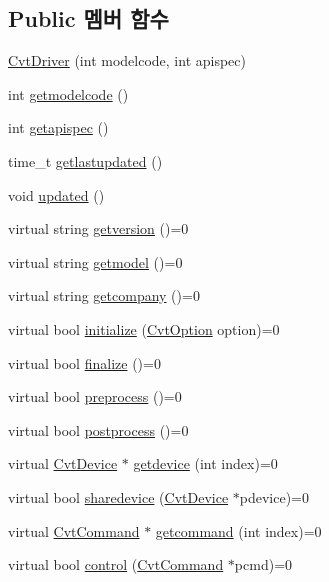 \subsection*{Public 멤버 함수}
\begin{DoxyCompactItemize}
\item 
\hyperlink{classstdcvt_1_1CvtDriver_a82925971b6e8ef2ce7f0b5d113120855}{Cvt\+Driver} (int modelcode, int apispec)
\item 
int \hyperlink{classstdcvt_1_1CvtDriver_a86ffa63425176824f6b0493be4e41cda}{getmodelcode} ()
\item 
int \hyperlink{classstdcvt_1_1CvtDriver_ad6e0edc0bc47015d446215e98b7bfc2f}{getapispec} ()
\item 
time\+\_\+t \hyperlink{classstdcvt_1_1CvtDriver_a442304919575a1c0adf4e89cd85a3bfb}{getlastupdated} ()
\item 
void \hyperlink{classstdcvt_1_1CvtDriver_abbaba1b9dd80aae9648dac8a44f31589}{updated} ()
\item 
virtual string \hyperlink{classstdcvt_1_1CvtDriver_a4b21fdbbee5e251ce8b65932108db51e}{getversion} ()=0
\item 
virtual string \hyperlink{classstdcvt_1_1CvtDriver_a276c9154120dc41563a6604dc9d8e15b}{getmodel} ()=0
\item 
virtual string \hyperlink{classstdcvt_1_1CvtDriver_a7566cb63ae741c1df91972f185dbc88c}{getcompany} ()=0
\item 
virtual bool \hyperlink{classstdcvt_1_1CvtDriver_a71322934c5b5ad0d5b167219cd23a0bb}{initialize} (\hyperlink{classstdcvt_1_1CvtOption}{Cvt\+Option} option)=0
\item 
virtual bool \hyperlink{classstdcvt_1_1CvtDriver_a22b39da5aafabec2ee9677ed138256e9}{finalize} ()=0
\item 
virtual bool \hyperlink{classstdcvt_1_1CvtDriver_ac15259a26d652d46c198307886d52257}{preprocess} ()=0
\item 
virtual bool \hyperlink{classstdcvt_1_1CvtDriver_a4bcae9e7c58d989a645a74d21e2fc5ea}{postprocess} ()=0
\item 
virtual \hyperlink{classstdcvt_1_1CvtDevice}{Cvt\+Device} $\ast$ \hyperlink{classstdcvt_1_1CvtDriver_adc2ce5ff6fe2426fd84ce3ae69731704}{getdevice} (int index)=0
\item 
virtual bool \hyperlink{classstdcvt_1_1CvtDriver_aeedcd62d3b6ed95f0584db5a7259f642}{sharedevice} (\hyperlink{classstdcvt_1_1CvtDevice}{Cvt\+Device} $\ast$pdevice)=0
\item 
virtual \hyperlink{classstdcvt_1_1CvtCommand}{Cvt\+Command} $\ast$ \hyperlink{classstdcvt_1_1CvtDriver_ad0378635152f2e35c0686c4fe92996e6}{getcommand} (int index)=0
\item 
virtual bool \hyperlink{classstdcvt_1_1CvtDriver_ac289321a67d660f5514c4ddfaa238ade}{control} (\hyperlink{classstdcvt_1_1CvtCommand}{Cvt\+Command} $\ast$pcmd)=0
\end{DoxyCompactItemize}


